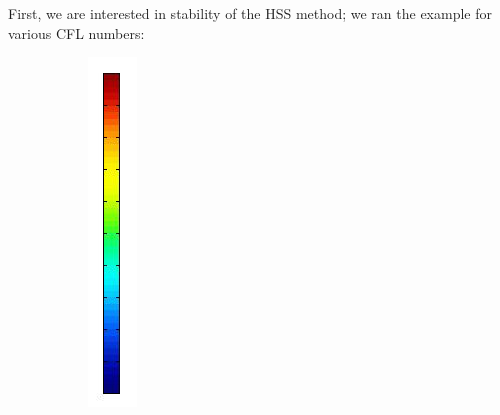 \documentclass[mathserif]{beamer}
\begin{document}
\begin{frame}
First, we are interested in stability of the HSS method; we ran the example for various CFL numbers:
\begin{figure}[H]
\centering
	\begin{subfigure}[H]{0.02\textwidth}
		\includegraphics[width=\textwidth]{images/timedep-multiscale/stability/scale.jpg}

\end{subfigure}
\end{figure}
\end{frame}
\end{document}
